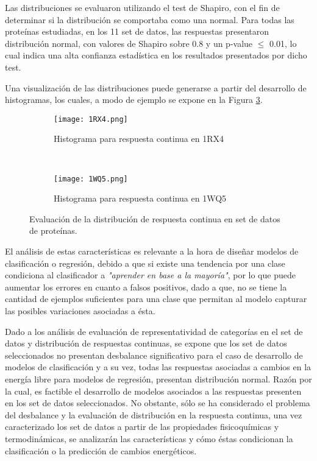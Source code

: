 Las distribuciones se evaluaron utilizando el test de Shapiro, con el fin de determinar si la distribución se comportaba como una normal. Para todas las proteínas estudiadas, en los 11 set de datos, las respuestas presentaron distribución normal, con valores de Shapiro sobre 0.8 y un p-value $\leq$ 0.01, lo cual indica una alta confianza estadística en los resultados presentados por dicho test.

Una visualización de las distribuciones puede generarse a partir del desarrollo de histogramas, los cuales, a modo de ejemplo se expone en la Figura \ref{fig:histogram}.

\begin{figure}[!h]
	\centering
	\begin{subfigure}{0.48\textwidth}
		\texttt{[image: 1RX4.png]}
		\caption{Histograma para respuesta continua en 1RX4}
		\label{fig:hist1}
	\end{subfigure}
	~ %
	\begin{subfigure}{0.48\textwidth}
		\texttt{[image: 1WQ5.png]}
		\caption{Histograma para respuesta continua en 1WQ5}
		\label{fig:hist2}
	\end{subfigure}
	
	\caption{Evaluación de la distribución de respuesta continua en set de datos de proteínas.}
	\label{fig:histogram}
\end{figure}

El análisis de estas características es relevante a la hora de diseñar modelos de clasificación o regresión, debido a que si existe una tendencia por una clase condiciona al clasificador a \textit{"aprender en base a la mayoría"}, por lo que puede aumentar los errores en cuanto a falsos positivos, dado a que, no se tiene la cantidad de ejemplos suficientes para una clase que permitan al modelo capturar las posibles variaciones asociadas a ésta.

Dado a los análisis de evaluación de representatividad de categorías en el set de datos y distribución de respuestas continuas, se expone que los set de datos seleccionados no presentan desbalance significativo para el caso de desarrollo de modelos de clasificación y a su vez, todas las respuestas asociadas a cambios en la energía libre para modelos de regresión, presentan distribución normal. Razón por la cual, es factible el desarrollo de modelos asociados a las respuestas presenten en los set de datos seleccionados. No obstante, sólo se ha considerado el problema del desbalance y la evaluación de distribución en la respuesta continua, una vez caracterizado los set de datos a partir de las propiedades fisicoquímicas y termodinámicas, se analizarán las características y cómo éstas condicionan la clasificación o la predicción de cambios energéticos.
